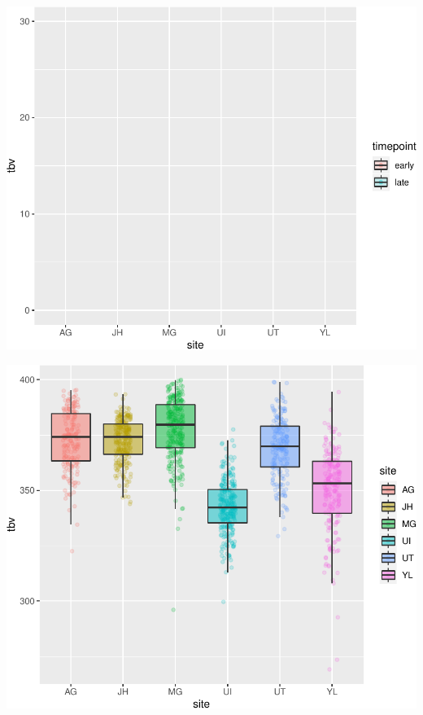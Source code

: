 \documentclass[
]{article}
\begin{document}
\begin{center}\includegraphics{paper_files/figure-latex/plot_tbv_site-1} \end{center}

\begin{center}\includegraphics{paper_files/figure-latex/plot_tbv-1} \end{center}
\end{document}
